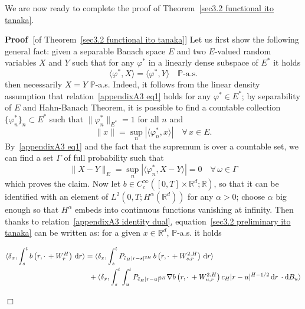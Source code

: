 \documentclass[10pt]{article}
\newcommand{\mathd}{\mathrm{d}}
\newcommand{\tmcolor}[2]{{\color{#1}{#2}}}
\newenvironment{proof}{\noindent\textbf{Proof\ }}{\hspace*{\fill}$\Box$\medskip}
\begin{document}
We are now ready to complete the proof of Theorem~\ref{sec3.2 functional ito
tanaka}.

\begin{proof}[of Theorem~\ref{sec3.2 functional ito tanaka}]
  Let us first show the following general fact: given a separable Banach space
  $E$ and two $E$\mbox{-}valued random variables $X$ and $Y$ such that for any
  $\varphi^{\ast}$ in a linearly dense subspace of $E^{\ast}$ it holds
  \begin{equation}
    \langle \varphi^{\ast}, X \rangle = \langle \varphi^{\ast}, Y \rangle
    \quad \mathbb{P} \text{-a.s.} \label{appendixA3 eq1}
  \end{equation}
  then necessarily $X = Y$ $\mathbb{P}$-a.s. Indeed, it follows from the
  linear density assumption that relation~{\eqref{appendixA3 eq1}} holds for
  any $\varphi^{\ast} \in E^{\ast}$; by separability of $E$ and Hahn-Banach
  Theorem, it is possible to find a countable collection $\{ \varphi_n^{\ast}
  \}_n \subset E^{\ast}$ such that $\| \varphi^{\ast}_n \|_{E^{\ast}} = 1$ for
  all $n$ and
  \[ \| x \| = \sup_n | \langle \varphi^{\ast}_n, x \rangle | \quad \forall \,
     x \in E. \]
  By~{\eqref{appendixA3 eq1}} and the fact that the supremum is over a
  countable set, we can find a set $\Gamma$ of full probability such that
  \[ \| X - Y \|_E = \sup_n | \langle \varphi_n^{\ast}, X - Y \rangle | = 0
     \quad \forall \, \omega \in \Gamma \]
  which proves the claim. Now let $b \in C^{\infty}_c ([0, T] \times
  \mathbb{R}^d ; \mathbb{R})$, so that it can be identified with an element of
  $L^2 (0, T ; H^{\alpha} (\mathbb{R}^d))$ for any $\alpha > 0$; choose
  $\alpha$ big enough so that $H^{\alpha}$ embeds into continuous functions
  vanishing at infinity. Then thanks to relation~{\eqref{appendixA3 identity
  dual}}, equation~{\eqref{sec3.2 preliminary ito tanaka}} can be written as:
  for a given $x \in \mathbb{R}^d$, $\mathbb{P}$-a.s. it holds
  
  \begin{align*}
    \langle \delta_x, \int_s^t b \left( r, \cdot \, + W^H_r \right) \, \mathd
    r \rangle & = \tmcolor{black}{\langle \delta_x, \int_s^t P_{\tilde{c}_H |
    r - s |^{2 H}} \, b \left( r, \cdot \, + W^{2, H}_{s, r} \right) \, \mathd
    r \rangle}\\
    & \enspace + \langle \delta_x, \int_s^t \int_u^t P_{\tilde{c}_H | r - u
    |^{2 H}} \nabla b \left( r, \cdot \, + W^{2, H}_{u, r} \right) c_H | r - u
    |^{H - 1 / 2} \, \mathd r \, \cdot \mathd B_u \rangle
  \end{align*}
  

\end{proof}
\end{document}
